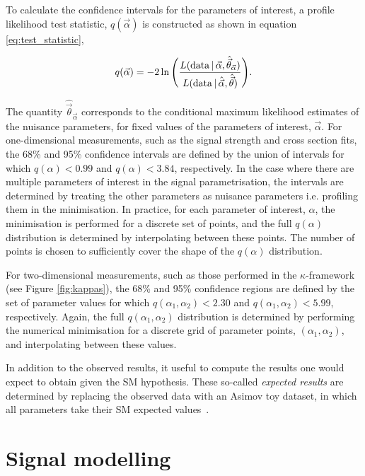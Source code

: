 To calculate the confidence intervals for the parameters of interest, a profile likelihood test statistic, $q(\vec{\alpha})$ is constructed as shown in equation \ref{eq:test_statistic},

\begin{equation}\label{eq:test_statistic}
    q(\vec{\alpha}) = -2 \ln \Bigg( \frac{L({\rm{data}}\,|\,\vec{\alpha},\hat{\vec{\theta}}_{\vec{\alpha}})}{L({\rm{data}}\,|\,\hat{\vec{\alpha}},\hat{\vec{\theta}})} \Bigg).
\end{equation}

\noindent
The quantity $\hat{\vec{\theta}}_{\vec{\alpha}}$ corresponds to the conditional maximum likelihood estimates of the nuisance parameters, for fixed values of the parameters of interest, $\vec{\alpha}$. For one-dimensional measurements, such as the signal strength and cross section fits, the 68\% and 95\% confidence intervals are defined by the union of intervals for which $q(\alpha)<0.99$ and $q(\alpha)<3.84$, respectively. In the case where there are multiple parameters of interest in the signal parametrisation, the intervals are determined by treating the other parameters as nuisance parameters i.e. profiling them in the minimisation. In practice, for each parameter of interest, $\alpha$, the minimisation is performed for a discrete set of points, and the full $q(\alpha)$ distribution is determined by interpolating between these points. The number of points is chosen to sufficiently cover the shape of the $q(\alpha)$ distribution.

For two-dimensional measurements, such as those performed in the $\kappa$-framework (see Figure \ref{fig:kappas}), the 68\% and 95\% confidence regions are defined by the set of parameter values for which $q(\alpha_1,\alpha_2)<2.30$ and $q(\alpha_1,\alpha_2)<5.99$, respectively. Again, the full $q(\alpha_1,\alpha_2)$ distribution is determined by performing the numerical minimisation for a discrete grid of parameter points, $(\alpha_1,\alpha_2)$, and interpolating between these values.

In addition to the observed results, it useful to compute the results one would expect to obtain given the SM hypothesis. These so-called \textit{expected results} are determined by replacing the observed data with an Asimov toy dataset, in which all parameters take their SM expected values~\cite{Cowan:2010js}.


\section{Signal modelling}\label{sec:sig_modelling}

